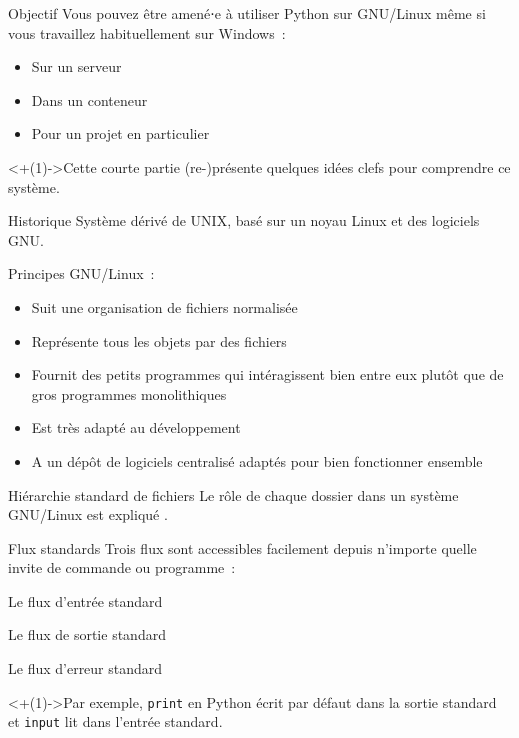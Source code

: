 \begin{frame}{Objectif}
  Vous pouvez être amené⋅e à utiliser Python sur GNU/Linux même si vous travaillez habituellement sur Windows~:

  \begin{itemize}[<+(1)->]
    \item Sur un serveur
    \item Dans un conteneur
    \item Pour un projet en particulier
  \end{itemize}

  \onslide<+(1)->{Cette courte partie (re-)présente quelques idées clefs pour comprendre ce système.}
\end{frame}

\begin{frame}{Historique}
  Système dérivé de UNIX, basé sur un noyau Linux et des logiciels GNU.
\end{frame}

\begin{frame}{Principes}
  GNU/Linux~:
  \begin{itemize}[<+(1)->]
    \item Suit une organisation de fichiers normalisée
    \item Représente tous les objets par des fichiers
    \item Fournit des petits programmes qui intéragissent bien entre eux plutôt que de gros programmes monolithiques
    \item Est très adapté au développement
    \item A un dépôt de logiciels centralisé adaptés pour bien fonctionner ensemble
  \end{itemize}
\end{frame}

\begin{frame}{Hiérarchie standard de fichiers}
  Le rôle de chaque dossier dans un système GNU/Linux est expliqué .
\end{frame}

\begin{frame}{Flux standards}
  Trois flux sont accessibles facilement depuis n'importe quelle invite de commande ou programme~:

  \begin{description}[<+(1)->]
    \item[\texttt{stdin}] Le flux d'entrée standard
    \item[\texttt{stdout}] Le flux de sortie standard
    \item[\texttt{stderr}] Le flux d'erreur standard
  \end{description}

  \onslide<+(1)->{Par exemple, \texttt{print} en Python écrit par défaut dans la sortie standard et \texttt{input} lit dans l'entrée standard.}
\end{frame}

